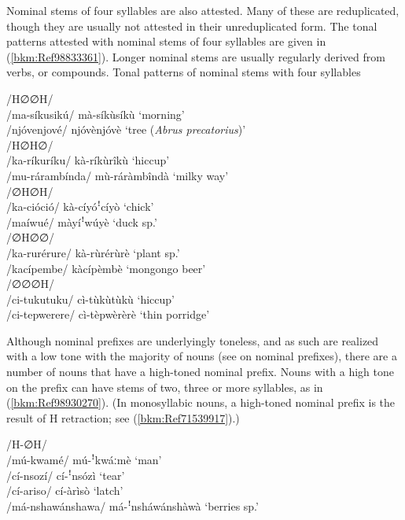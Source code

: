 Nominal stems of four syllables are also attested. Many of these are reduplicated, though they are usually not attested in their unreduplicated form. The tonal patterns attested with nominal stems of four syllables are given in (\ref{bkm:Ref98833361}). Longer nominal stems are usually regularly derived from verbs, or compounds.
\ea
\label{bkm:Ref98833361}
  Tonal patterns of nominal stems with four syllables

\ea
/H∅∅H/ \tab [HLHL]\\
/ma-síkusikú/ \tab mà-síkùsíkù \tab ‘morning’\\
/njóvenjové/ \tab njóvènjóvè \tab ‘tree (\textit{Abrus precatorius})’\\
\ex 
/H∅H∅/ \tab [HLFL]\\
/ka-ríkuríku/ \tab kà-ríkùrîkù \tab ‘hiccup’\\
/mu-rárambínda/ \tab mù-ráràmbîndà \tab ‘milky way’\\
\ex 
/∅H∅H/ \tab {[HH!HL] {\textasciitilde} [LH!HL]}\\
/ka-cióció/ \tab kà-cíyóꜝcíyò \tab ‘chick’\\
/maíwué/ \tab màyíꜝwúyè \tab ‘duck sp.’\\
\ex 
/∅H∅∅/ \tab [LHLL]\\
/ka-rurérure/ \tab kà-rùrérùrè \tab ‘plant sp.’\\
/kacípembe/ \tab kàcípèmbè \tab ‘mongongo beer’\\
\ex 
/∅∅∅H/ \tab [LLHL\\
/bbimbiriró/ \tab bbìmbìrírò \tab ‘rubbish heap’\\
/harantené/ \tab hàrànténè \tab ‘cockroach’\\
\ex /∅∅∅∅/ \tab [LLLL] \tab \\
/ci-tukutuku/ \tab cì-tùkùtùkù \tab ‘hiccup’\\
/ci-tepwerere/ \tab cì-tèpwèrèrè \tab ‘thin porridge’\\
\z\z

Although nominal prefixes are underlyingly toneless, and as such are realized with a low tone with the majority of nouns (see  on nominal prefixes), there are a number of nouns that have a high-toned nominal prefix. Nouns with a high tone on the prefix can have stems of two, three or more syllables, as in (\ref{bkm:Ref98930270}). (In monosyllabic nouns, a high-toned nominal prefix is the result of H retraction; see (\ref{bkm:Ref71539917}).)

\ea
\label{bkm:Ref98930270}
/H-∅H/ \tab [H-ꜝHL] \\
/mú-kwamé/ \tab mú-ꜝkwáːmè \tab ‘man’\\
/cí-nsozí/ \tab cí-ꜝnsózì \tab ‘tear’\\
/cí-ariso/ \tab cí-àrìsò \tab ‘latch’\\
/má-nshawánshawa/ \tab má-ꜝnsháwánshàwà \tab ‘berries sp.’\\
\z

